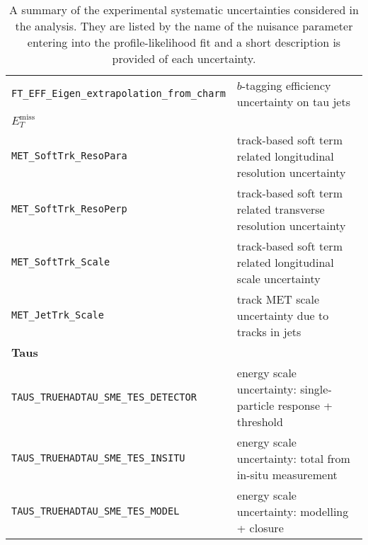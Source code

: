 \begin{table}
{\begin{tabular}{ll}
      \texttt{FT\_EFF\_Eigen\_extrapolation\_from\_charm} & $b$-tagging efficiency uncertainty on tau jets \\%
      {\bfseries $E_T^{\text{miss}}$}&\\
      \texttt{MET\_SoftTrk\_ResoPara} & track-based soft term related longitudinal resolution uncertainty \\
      \texttt{MET\_SoftTrk\_ResoPerp} &  track-based soft term related transverse resolution uncertainty \\
      \texttt{MET\_SoftTrk\_Scale} & track-based soft term related longitudinal scale uncertainty \\
      \texttt{MET\_JetTrk\_Scale} & track MET scale uncertainty due to tracks in jets \\
      {\bfseries Taus}&\\
      \texttt{TAUS\_TRUEHADTAU\_SME\_TES\_DETECTOR} & energy scale uncertainty: single-particle response + threshold \\%
      \texttt{TAUS\_TRUEHADTAU\_SME\_TES\_INSITU} & energy scale uncertainty: total from in-situ measurement \\%
      \texttt{TAUS\_TRUEHADTAU\_SME\_TES\_MODEL} & energy scale uncertainty: modelling + closure \\%
      \bottomrule
    \end{tabular}
  }
  \caption{A summary of the experimental systematic uncertainties considered in
    the analysis. They are listed by the name of the nuisance parameter entering
    into the profile-likelihood fit and a short description is provided of each
    uncertainty.}
  \label{tab:expSyst}
\end{table}